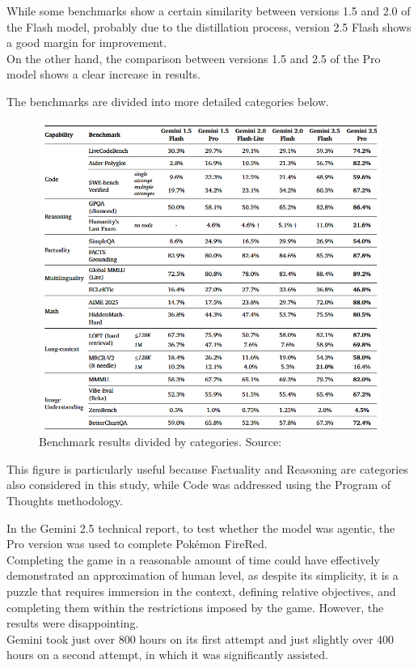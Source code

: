 \documentclass[12pt]{article}
\begin{document}
While some benchmarks show a certain similarity between versions 1.5 and 2.0 of the Flash model, probably due to the distillation process, version 2.5 Flash shows a good margin for improvement.\\
On the other hand, the comparison between versions 1.5 and 2.5 of the Pro model shows a clear increase in results.

The benchmarks are divided into more detailed categories below. 
    
    \begin{figure}[H]
    \centering
            \includegraphics[width=1\textwidth]{TableGeminiBenchmarks.png}
    \caption[Detailed table of Gemini benchmarks]{Benchmark results divided by categories. Source: \cite{comanici2025gemini25pushingfrontier}}
    \end{figure}    
    
This figure is particularly useful because Factuality and Reasoning are categories also considered in this study, while Code was addressed using the Program of Thoughts methodology.    

In the Gemini 2.5 technical report, to test whether the model was agentic, the Pro version was used to complete Pokémon FireRed.\\
Completing the game in a reasonable amount of time could have effectively demonstrated an approximation of human level, as despite its simplicity, it is a puzzle that requires immersion in the context, defining relative objectives, and completing them within the restrictions imposed by the game. However, the results were disappointing.\\
Gemini took just over 800 hours on its first attempt and just slightly over 400 hours on a second attempt, in which it was significantly assisted.\cite{comanici2025gemini25pushingfrontier}
\end{document}

